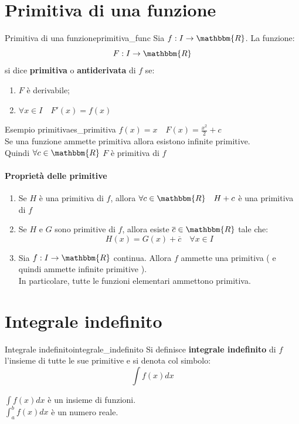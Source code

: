 \documentclass[12pt]{report}
\newcounter{definition}
\newcommand{\nmu}{}
\begin{document}
			\section{Primitiva di una funzione}
			\begin{definition}{\nmu Primitiva di una funzione}{primitiva_func}
				Sia $f: I \to \mathbbm{R}$. La funzione:
				\[
				F: I \to \mathbbm{R}
				\]
				si dice \textbf{primitiva} o \textbf{antiderivata} di $f$ se:
				\begin{enumerate}[label=(\arabic*)]
					\item $F$ è derivabile;
					\item $\forall x \in I \quad F'(x) = f(x)$
				\end{enumerate}
			\end{definition}
			\begin{note}{\nmu Esempio primitiva}{es_primitiva}
				$f(x) = x \quad F(x) = \frac{x^2}{2} + c$ \\
				Se una funzione ammette primitiva allora esistono infinite primitive. \\
				Quindi $\forall c \in \mathbbm{R}$ $F$ è primitiva di $f$
			\end{note}
			\paragraph{Proprietà delle primitive} \quad
			\begin{enumerate}[label=(\arabic*)]
				\item Se $H$ è una primitiva di $f$, allora $\forall c \in \mathbbm{R} \quad H + c$ è una primitiva di $f$
				\item  Se $H$ e $G$ sono primitive di $f$, allora esiste $\overline{c} \in \mathbbm{R}$ tale che:
				\[
				H(x) = G(x) + \overline{c} \quad \forall x \in I
				\]
				\item Sia $f: I \to \mathbbm{R}$ continua. Allora $f$ ammette una primitiva ( e quindi ammette infinite primitive ). \\
				In particolare, tutte le funzioni elementari ammettono primitiva.
			\end{enumerate}
			\section{Integrale indefinito}
			\begin{definition}{\nmu Integrale indefinito}{integrale_indefinito}
				Si definisce \textbf{integrale indefinito} di $f$ l'insieme di tutte le sue primitive e si denota col simbolo:
				\[
				\int f(x)dx
				\]
			\end{definition}
			\begin{note}{}{}
				$\int f(x)dx$ è un insieme di funzioni. \\
				$\int_{a}^{b} f(x)dx$ è un numero reale.
			\end{note}
\end{document}
